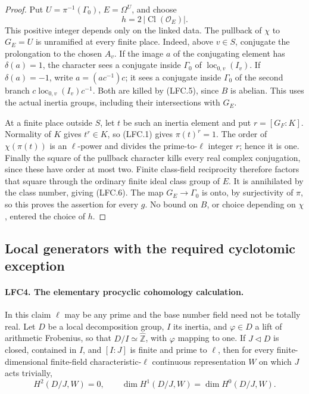 \begin{proof}
Put \(U=\pi^{-1}(\Gamma_0)\), \(E=\Omega^U\), and choose
\[
                  h=2\,|\operatorname{Cl}(\mathcal O_E)|.
                                                        \tag{LFC.6}
\]
This positive integer depends only on the linked data.
The pullback of \(\chi\) to \(G_E=U\) is unramified at every
finite place.  Indeed, above \(v\in S\), conjugate the
prolongation to the chosen \(A_v\).
If the image \(a\) of the conjugating element has
\(\delta(a)=1\), the character sees a conjugate inside
\(\Gamma_0\) of \(\operatorname{loc}_{0,v}(I_v)\).
If \(\delta(a)=-1\), write \(a=(ac^{-1})c\);
it sees a conjugate inside \(\Gamma_0\) of the second branch
\(c\operatorname{loc}_{0,v}(I_v)c^{-1}\).
Both are killed by (LFC.5), since \(B\) is abelian.
This uses the actual inertia groups, including their
intersections with \(G_E\).

At a finite place outside \(S\), let \(t\) be such an inertia
element and put \(r=[G_F:K]\).  Normality of \(K\) gives
\(t^r\in K\), so (LFC.1) gives \(\pi(t)^r=1\).
The order of \(\chi(\pi(t))\) is an \(\ell\)-power and divides
the prime-to-\(\ell\) integer \(r\); hence it is one.
Finally the square of the pullback character kills every
real complex conjugation, since these have order at most two.
Finite class-field reciprocity therefore factors that square
through the ordinary finite ideal class group of \(E\).
It is annihilated by the class number, giving (LFC.6).
The map \(G_E\to\Gamma_0\) is onto, by surjectivity of \(\pi\),
so this proves the assertion for every \(g\).
No bound on \(B\), or choice depending on \(\chi\), entered
the choice of \(h\).
\end{proof}

\subsection{Local generators with the required cyclotomic exception}

\paragraph{LFC4. The elementary procyclic cohomology calculation.}
\label{claim:LFC4}
In this claim \(\ell\) may be any prime and the base number
field need not be totally real.
Let \(D\) be a local decomposition group, \(I\) its inertia,
and \(\varphi\in D\) a lift of arithmetic Frobenius, so that
\(D/I\simeq\widehat{\mathbb Z}\), with \(\varphi\) mapping to
one.  If \(J\triangleleft D\) is closed, contained in \(I\),
and \([I:J]\) is finite and prime to \(\ell\), then for every
finite-dimensional finite-field characteristic-\(\ell\)
continuous representation \(W\) on which \(J\) acts trivially,
\[
 H^2(D/J,W)=0,\qquad
 \dim H^1(D/J,W)=\dim H^0(D/J,W).                         \tag{LFC.7}
\]

